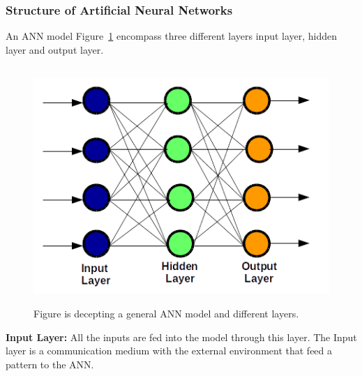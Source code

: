 \subsubsection{Structure of Artificial Neural Networks} An ANN model Figure~\ref{fig:ann_diag01} encompass three different layers input layer, hidden layer and output layer.\\

\begin{figure}[h]
\centering
\includegraphics[width=12cm,height=9cm]{figures/ann_diag01.png}
\caption{Figure is decepting a general ANN model and different layers.}
\label{fig:ann_diag01}
\end{figure}

\textbf{Input Layer:} All the inputs are fed into the model through this layer. The Input layer is a communication medium with the external environment that feed a pattern to the ANN.

